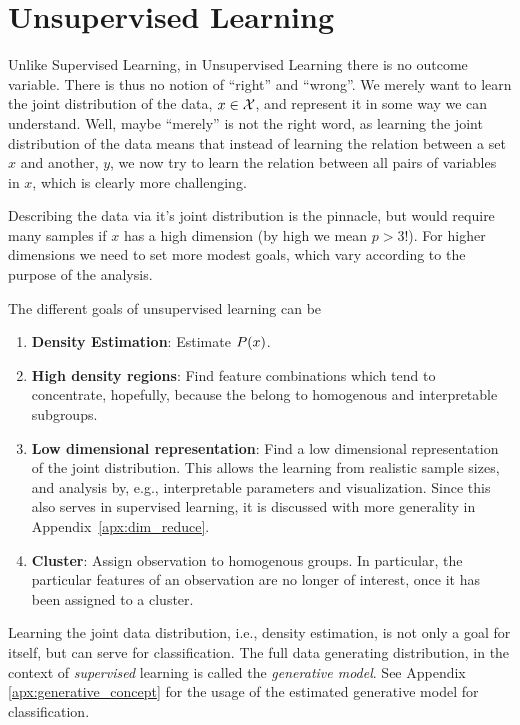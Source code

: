 
\chapter{Unsupervised Learning}

\label{sec:unsupervised}

Unlike Supervised Learning, in Unsupervised Learning there is no outcome variable. 
There is thus no notion of ``right'' and ``wrong''. 
We merely want to learn the joint distribution of the data, $x \in \mathcal{X}$, and represent it in some way we can understand. 
Well, maybe ``merely'' is not the right word, as learning the joint distribution of the data means that instead of learning the relation between a set $x$ and another, $y$, we now try to learn the relation between all pairs of variables in $x$, which is clearly more challenging. 

Describing the data via it's joint distribution is the pinnacle, but would require many samples if $x$ has a high dimension (by high we mean $p>3$!). For higher dimensions we need to set more modest goals, which vary according to the purpose of the analysis.

The different goals of unsupervised learning can be
\begin{enumerate}
\item \textbf{Density Estimation}: Estimate $P(x)$.
\item \textbf{High density regions}: Find feature combinations which tend to concentrate, hopefully, because the belong to homogenous and interpretable subgroups.
\item \textbf{Low dimensional representation}: Find a low dimensional representation of the joint distribution. This allows the learning from realistic sample sizes, and analysis by, e.g., interpretable parameters and visualization.
Since this also serves in supervised learning, it is discussed with more generality in Appendix~\ref{apx:dim_reduce}.
\item \textbf{Cluster}: Assign observation to homogenous groups. In particular, the particular features of an observation are no longer of interest, once it has been assigned to a cluster.
\end{enumerate}


\begin{remark}
Learning the joint data distribution, i.e., density estimation, is not only a goal for itself, but can serve for classification. 
The full data generating distribution, in the context of \emph{supervised} learning is called the \emph{generative model}.
See Appendix \ref{apx:generative_concept} for the usage of the estimated generative model for classification.
\end{remark}


